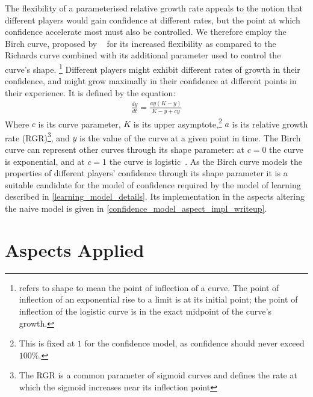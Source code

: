 The flexibility of a parameterised relative growth rate appeals to the notion
that different players would gain confidence at different rates, but the point
at which confidence accelerate most must also be controlled. We therefore employ
the Birch curve, proposed by \citeauthor{birch1999new}~\cite{birch1999new} for
its increased flexibility as compared to the Richards curve combined with its
additional parameter used to control the curve's shape.
\footnote{\citet{birch1999new} refers to shape to mean the point of
inflection of a curve. The point of inflection of an exponential rise to a limit
is at its initial point; the point of inflection of the logistic curve is in the
exact midpoint of the curve's growth.} Different players might exhibit different
rates of growth in their confidence, and might grow maximally in their
confidence at different points in their experience. It is defined by the
equation:
\begin{align*}
\frac{dy}{dt} = \frac{ay(K-y)}{K-y+cy}
\end{align*}
Where $c$ is its curve parameter, $K$ is its upper asymptote,\footnote{This is
fixed at $1$ for the confidence model, as confidence should never exceed
$100\%$.} $a$ is its relative growth rate (RGR)\footnote{The RGR is a common
parameter of sigmoid curves and defines the rate at which the sigmoid increases
near its inflection point}, and $y$ is the value of the curve at a given point
in time. The Birch curve can represent other curves through its shape parameter:
at $c=0$ the curve is exponential, and at $c=1$ the curve is
logistic~\cite{birch1999new}. As the Birch curve models the properties of
different players' confidence through its shape parameter it is a suitable
candidate for the model of confidence required by the model of learning
described in \cref{learning_model_details}. Its implementation in the aspects
altering the naive model is given in
\cref{confidence_model_aspect_impl_writeup}.


\section{Aspects Applied}
\label{sec:optimisation_with_aspects_aspectsdeveloped}
\label{aspects_applied_section}




